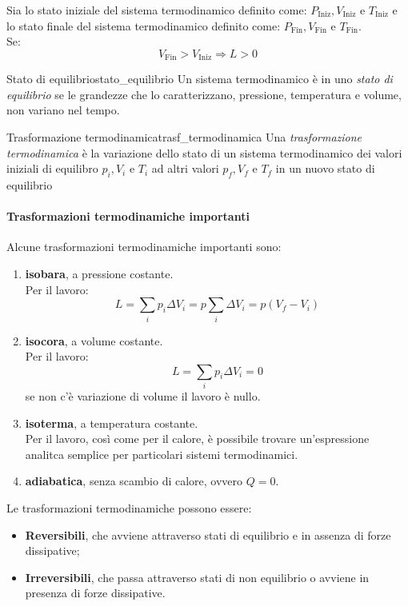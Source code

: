 \documentclass[12pt]{report}
\newcounter{definition}
\newcommand{\nmu}{}
\begin{document}
	\begin{note}{}{}
		Sia lo stato iniziale del sistema termodinamico definito come: $P_{\text{Iniz}}, V_{\text{Iniz}}$ e $T_{\text{Iniz}}$ e lo stato finale del sistema termodinamico definito come:
		$P_{\text{Fin}}, V_{\text{Fin}}$ e $T_{\text{Fin}}$. \\
		Se:
		\[
		V_{\text{Fin}} > V_{\text{Iniz}} \Rightarrow L > 0
		\]
	\end{note}
	\begin{definition}{\nmu Stato di equilibrio}{stato_equilibrio}
		Un sistema termodinamico è in uno \textit{stato di equilibrio} se le grandezze che lo caratterizzano, pressione, temperatura e volume, non variano nel tempo.
	\end{definition}
	\begin{definition}{\nmu Trasformazione termodinamica}{trasf_termodinamica}
		Una \textit{trasformazione termodinamica} è la variazione dello stato di un sistema termodinamico dei valori iniziali di equilibro $p_i, V_i$ e $T_i$ ad altri valori $p_f, V_f$ e $T_f$ in un nuovo stato di equilibrio
	\end{definition}
	\paragraph{Trasformazioni termodinamiche importanti}
	Alcune trasformazioni termodinamiche importanti sono:
	\begin{enumerate}
		\item \textbf{isobara}, a pressione costante.\\
		Per il lavoro:
		\[
		L = \sum_{i}p_i\Delta V_i = p\sum_{i}\Delta V_i = p(V_f - V_i)
		\]
		\item \textbf{isocora}, a volume costante. \\
		Per il lavoro:
		\[
		L = \sum_{i}p_i\Delta V_i = 0
		\]
		se non c'è variazione di volume il lavoro è nullo.
		\item \textbf{isoterma}, a temperatura costante. \\
		Per il lavoro, così come per il calore, è possibile trovare un'espressione analitca semplice per particolari sistemi termodinamici.
		\item \textbf{adiabatica}, senza scambio di calore, ovvero $Q = 0$.
	\end{enumerate}
	Le trasformazioni termodinamiche possono essere:
	\begin{itemize}
		\item \textbf{Reversibili}, che avviene attraverso stati di equilibrio e in assenza di forze dissipative;
		\item \textbf{Irreversibili}, che passa attraverso stati di non equilibrio o avviene in presenza di forze dissipative.
	\end{itemize}
\end{document}
